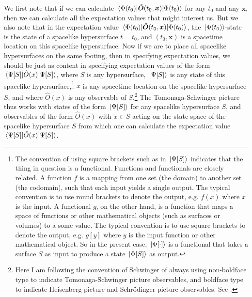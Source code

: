 We first note that if we can calculate $\ev*{\hat{\bm{O}}(t_0,\bm{x})}{\Phi(t_0)}$ for any $t_0$ and any $\bm{x}$, then we can calculate all the expectation values that might interest us. But we also note that in the expectation value $\ev*{\hat{\bm{O}}(t_0,\bm{x})}{\Phi(t_0)}$,  the $\ket*{\Phi(t_0)}$-state is the state of a spacelike hypersurface $t=t_0$, and $(t_0,\bm{x})$ is a spacetime location on this spacelike hypersurface. Now if we are to place all spacelike hypersurfaces on the same footing, then in specifying expectation values, we should be just as content in specifying expectation values of the form $\ev*{\hat{O}(x)}{\Psi[S]}$, where $S$ is any hypersurface, $\ket*{\Psi[S]}$ is any state of this spacelike hypersurface,\footnote{The convention of using square brackets such as in $\ket*{\Psi[S]}$ indicates that the thing in question is a functional. Functions and functionals are closely related. A function $f$ is a mapping from one set (the domain) to another set (the codomain), such that each input yields a single output. The typical convention is to use round brackets to denote the output, e.g. $f(x)$ where $x$ is the input. A functional $g$, on the other hand, is a function that maps a space of functions or other mathematical objects (such as surfaces or volumes) to a some value. The typical convention is to use square brackets to denote the output, e.g. $g[y]$ where $y$ is the input function or other mathematical object. So in the present case, $\ket*{\Phi[\cdot]}$ is a functional that takes a surface $S$ as input to produce a state $\ket*{\Phi[S]}$ as output.} $x$ is any spacetime location on the spacelike hypersurface $S$, and where $\hat{O}(x)$ is any observable of $S$.\footnote{\label{boldref}Here I am following the convention of Schwinger of always using non-boldface type to indicate Tomonaga-Schwinger picture observables, and boldface type to indicate Heisenberg picture and Schr\"{o}dinger picture observables. See \cite[p. 1448]{SchwingerJulianI}.} The Tomonaga-Schwinger picture thus works with states of the form $\ket*{\Psi[S]}$ for any spacelike hypersurface $S$, and observables of the form $\hat{O}(x)$ with $x\in S$ acting on the state space of the spacelike hypersurface $S$ from which one can calculate the expectation value $\ev*{\hat{O}(x)}{\Psi[S]}$.

